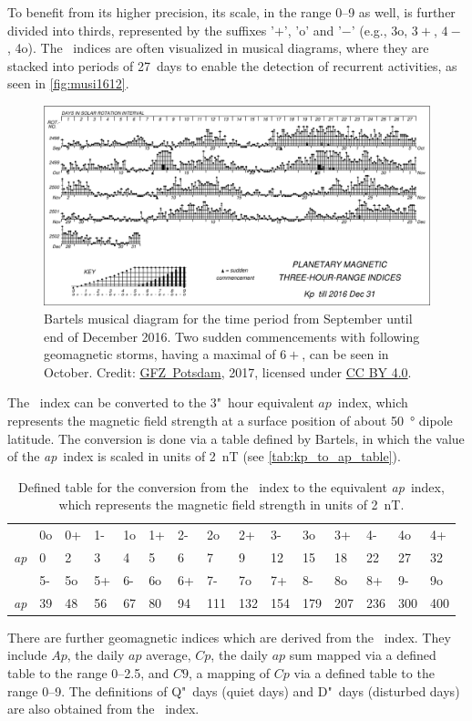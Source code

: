 To benefit from its higher precision, its scale, in the range 0--9 as well, is further divided into thirds, represented by the suffixes '$+$', 'o' and '$-$' (e.g., 3o, $3+$, $4-$, 4o). The \Kp{}~indices are often visualized in musical diagrams, where they are stacked into periods of 27~days to enable the detection of recurrent activities, as seen in \autoref{fig:musi1612}.
\begin{figure}[htb]
	\centering
	\includegraphics[width=\textwidth]{figures_of_others/images/musi1612.pdf}
	\caption{Bartels musical \Kp{} diagram for the time period from September until end of December 2016. Two sudden commencements with following geomagnetic storms, having a maximal \Kp{} of $6+$, can be seen in October. Credit: \href{http://www.gfz-potsdam.de/en/kp-index/}{GFZ~Potsdam}, 2017, licensed under \href{https://creativecommons.org/licenses/by/4.0/}{CC BY 4.0}.}
	\label{fig:musi1612}
\end{figure}

The \Kp{}~index can be converted to the 3"~hour equivalent $ap$~index, which represents the magnetic field strength at a surface position of about \SI{50}{\degree} dipole latitude. The conversion is done via a table defined by Bartels, in which the value of the \textit{ap}~index is scaled in units of \SI{2}{nT} (see \autoref{tab:kp_to_ap_table}).
\begin{table}
	\caption{Defined table for the conversion from the \Kp~index to the equivalent \textit{ap}~index, which represents the magnetic field strength in units of \SI{2}{nT}.}
	\label{tab:kp_to_ap_table}
	\centering
	\begin{tabular}{lssssssssssssss}
		\Kp	&0o	&0+	&1-	&1o	&1+	&2-	&2o	&2+	&3-	&3o	&3+	&4-	&4o	&4+\\
		\textit{ap}	&0	&2	&3	&4	&5	&6	&7	&9	&12	&15	&18	&22	&27	&32\\
		\hline
		\Kp	&5-	&5o	&5+	&6-	&6o	&6+	&7-	&7o	&7+	&8-	&8o	&8+	&9-	&9o\\
		\textit{ap}	&39	&48	&56	&67	&80	&94	&111	&132	&154	&179	&207	&236	&300	&400
	\end{tabular}
\end{table}
There are further geomagnetic indices which are derived from the \Kp{}~index. They include $Ap$, the daily $ap$ average, $Cp$, the daily $ap$ sum mapped via a defined table to the range \numrange{0}{2.5}, and $C9$, a mapping of $Cp$ via a defined table to the range \numrange{0}{9}. The definitions of Q"~days (quiet days) and D"~days (disturbed days) are also obtained from the \Kp{}~index.

